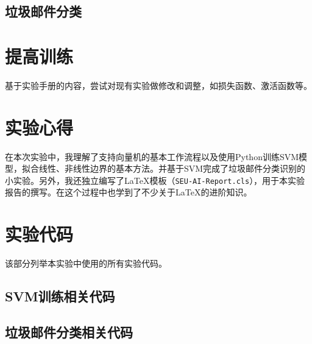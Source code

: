 \documentclass{SEU-AI-Report}
\begin{document}
\subsection{垃圾邮件分类}
\CodeReference{}
\section{提高训练}
基于实验手册的内容，尝试对现有实验做修改和调整，如损失函数、激活函数等。

\section{实验心得}

在本次实验中，我理解了支持向量机的基本工作流程以及使用Python训练SVM模型，拟合线性、非线性边界的基本方法。并基于SVM完成了垃圾邮件分类识别的小实验。另外，我还独立编写了\LaTeX 模板（\texttt{SEU-AI-Report.cls}），用于本实验报告的撰写。在这个过程中也学到了不少关于\LaTeX 的进阶知识。

\nocite{qiu2020nndl}
\printbibliography

\appendix
\section{实验代码}
该部分列举本实验中使用的所有实验代码。
\subsection{SVM训练相关代码}\label{sec:SVM}
\subsection{垃圾邮件分类相关代码}\label{sec:spam}
\end{document}
